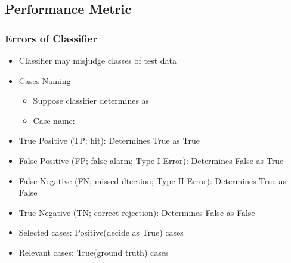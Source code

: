\subsection{Performance Metric}

\subsubsection*{Errors of Classifier}
\begin{itemize}
    \item Classifier may misjudge classes of test data
    \item Cases Naming
    \begin{itemize}
        \item Suppose classifier determines  as 
        \item Case name: \textbf{}
    \end{itemize}
    \item True Positive (TP; hit): Determines True as True
    \item False Positive (FP; false alarm; Type I Error): Determines False as True
    \item False Negative (FN; missed dtection; Type II Error): Determines True as False
    \item True Negative (TN; correct rejection): Determines False as False
    \item Selected cases: Positive(decide as True) cases
    \item Relevant cases: True(ground truth) cases
\end{itemize}
\begin{figures}
\end{figures}

